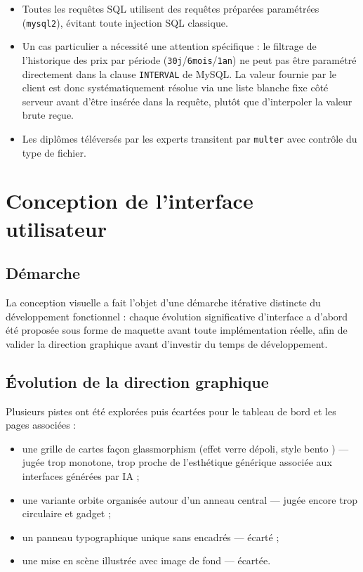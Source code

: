 \documentclass[12pt,a4paper]{report}
\begin{document}
\begin{itemize}
    \item Toutes les requêtes SQL utilisent des requêtes préparées paramétrées (\texttt{mysql2}), évitant toute injection SQL classique.
    \item Un cas particulier a nécessité une attention spécifique : le filtrage de l'historique des prix par période (\texttt{30j}/\texttt{6mois}/\texttt{1an}) ne peut pas être paramétré directement dans la clause \texttt{INTERVAL} de MySQL. La valeur fournie par le client est donc systématiquement résolue via une liste blanche fixe côté serveur avant d'être insérée dans la requête, plutôt que d'interpoler la valeur brute reçue.
    \item Les diplômes téléversés par les experts transitent par \texttt{multer} avec contrôle du type de fichier.
\end{itemize}

\chapter{Conception de l'interface utilisateur}
\label{chap:ui}

\section{Démarche}

La conception visuelle a fait l'objet d'une démarche itérative distincte du développement fonctionnel : chaque évolution significative d'interface a d'abord été proposée sous forme de maquette avant toute implémentation réelle, afin de valider la direction graphique avant d'investir du temps de développement.

\section{Évolution de la direction graphique}

Plusieurs pistes ont été explorées puis écartées pour le tableau de bord et les pages associées :
\begin{itemize}
    \item une grille de cartes façon \og glassmorphism \fg{} (effet verre dépoli, style \og bento \fg{}) --- jugée trop monotone, trop proche de l'esthétique générique associée aux interfaces générées par IA ;
    \item une variante \og orbite \fg{} organisée autour d'un anneau central --- jugée encore trop \og circulaire \fg{} et gadget ;
    \item un panneau typographique unique sans encadrés --- écarté ;
    \item une mise en scène illustrée avec image de fond --- écartée.
\end{itemize}
\end{document}
